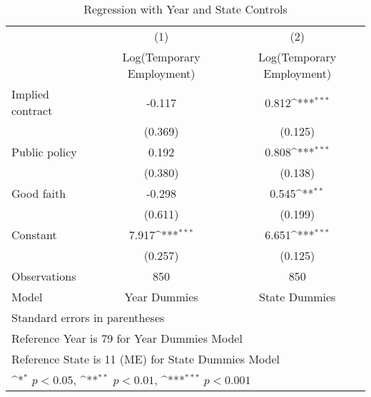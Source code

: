 {
\def\sym#1{\ifmmode^{#1}\else\(^{#1}\)\fi}
\begin{longtable}{l*{2}{c}}
\caption{Regression with Year and State Controls\label{2d}}\\
\hline\hline\endfirsthead\hline\endhead\hline\endfoot\endlastfoot
                    &\multicolumn{1}{c}{(1)}&\multicolumn{1}{c}{(2)}\\
                    &\multicolumn{1}{c}{Log(Temporary Employment)}&\multicolumn{1}{c}{Log(Temporary Employment)}\\
\hline
Implied contract    &      -0.117         &       0.812\sym{***}\\
                    &     (0.369)         &     (0.125)         \\
[1em]
Public policy       &       0.192         &       0.808\sym{***}\\
                    &     (0.380)         &     (0.138)         \\
[1em]
Good faith          &      -0.298         &       0.545\sym{**} \\
                    &     (0.611)         &     (0.199)         \\
[1em]
Constant            &       7.917\sym{***}&       6.651\sym{***}\\
                    &     (0.257)         &     (0.125)         \\
\hline
Observations        &         850         &         850         \\
Model               &Year Dummies         &State Dummies         \\
\hline\hline
\multicolumn{3}{l}{\footnotesize Standard errors in parentheses}\\
\multicolumn{3}{l}{\footnotesize Reference Year is 79 for Year Dummies Model}\\
\multicolumn{3}{l}{\footnotesize Reference State is 11 (ME) for State Dummies Model}\\
\multicolumn{3}{l}{\footnotesize \sym{*} \(p<0.05\), \sym{**} \(p<0.01\), \sym{***} \(p<0.001\)}\\
\end{longtable}
}
